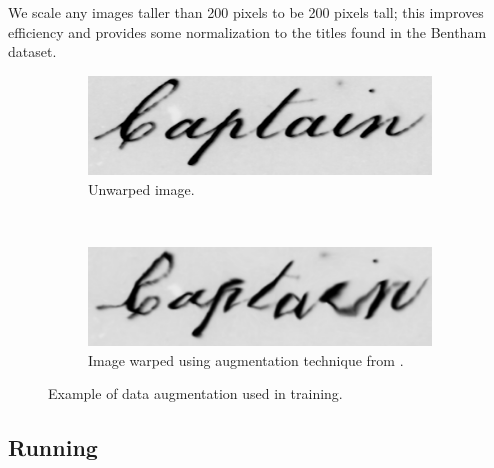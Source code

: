 \documentclass[ms,electronic,twosidetoc,letterpaper,chaptercenter,parttop,lol,lof,lot]{byumsphd}
\begin{document}
We scale any images taller than 200 pixels to be 200 pixels tall; this improves efficiency and provides some normalization to the titles found in the Bentham dataset.

\begin{figure}
    \centering
    \begin{subfigure}[t]{0.46\textwidth}
    		\centering
    		\includegraphics[width=\textwidth]{Captain_unwarped}
    		\caption{Unwarped image.}
    	\end{subfigure}
    	~
    	\begin{subfigure}[t]{0.46\textwidth}
    		\centering
    		\includegraphics[width=\textwidth]{Captain_warped}
    		\caption{Image warped using augmentation technique from \cite{wigington2017}.}
    	\end{subfigure}
    	\caption{Example of data augmentation used in training.}
    	\label{fig:augmentation}
\end{figure}


\subsection{Running}
\end{document}
